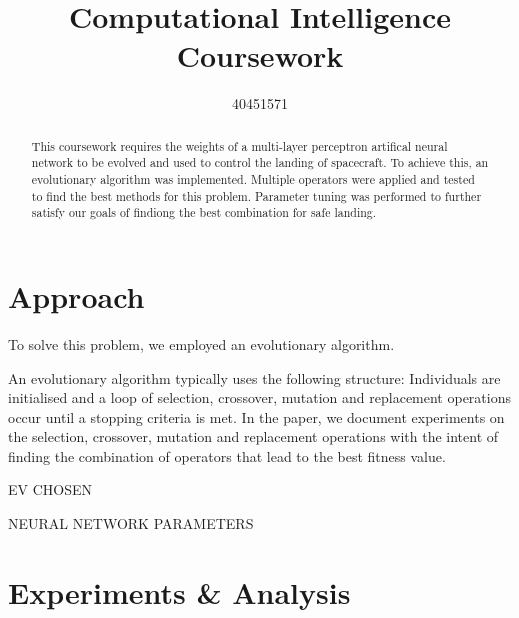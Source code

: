 \documentclass[sigconf]{acmart}
\begin{document}
\title{Computational Intelligence Coursework}

\author{40451571}



\begin{abstract}This coursework requires the weights of a multi-layer perceptron artifical neural network to be evolved and used to control the landing of spacecraft. To achieve this, an evolutionary algorithm was implemented. Multiple operators were applied and tested to find the best methods for this problem. Parameter tuning was performed to further satisfy our goals of findiong the best combination for safe landing.
\end{abstract}





\maketitle

\section{Approach}
To solve this problem, we employed an evolutionary algorithm.  \cite{Tesla}

An evolutionary algorithm typically uses the following structure: Individuals are initialised and a loop of selection, crossover, mutation and replacement operations occur until a stopping criteria is met. In the paper, we document experiments on the selection, crossover, mutation and replacement operations with the intent of finding the combination of operators that lead to the best fitness value.

EV CHOSEN

NEURAL NETWORK PARAMETERS
\section{Experiments \& Analysis}
\end{document}
